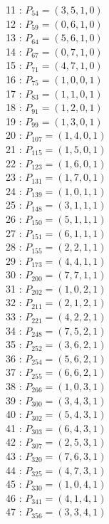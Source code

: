 \documentclass{article}
\begin{document}
{\begin{multicols}{3}
11 : $P_{54}=( 3, 5, 1, 0 )$\\
12 : $P_{59}=( 0, 6, 1, 0 )$\\
13 : $P_{64}=( 5, 6, 1, 0 )$\\
14 : $P_{67}=( 0, 7, 1, 0 )$\\
15 : $P_{71}=( 4, 7, 1, 0 )$\\
16 : $P_{75}=( 1, 0, 0, 1 )$\\
17 : $P_{83}=( 1, 1, 0, 1 )$\\
18 : $P_{91}=( 1, 2, 0, 1 )$\\
19 : $P_{99}=( 1, 3, 0, 1 )$\\
20 : $P_{107}=( 1, 4, 0, 1 )$\\
21 : $P_{115}=( 1, 5, 0, 1 )$\\
22 : $P_{123}=( 1, 6, 0, 1 )$\\
23 : $P_{131}=( 1, 7, 0, 1 )$\\
24 : $P_{139}=( 1, 0, 1, 1 )$\\
25 : $P_{148}=( 3, 1, 1, 1 )$\\
26 : $P_{150}=( 5, 1, 1, 1 )$\\
27 : $P_{151}=( 6, 1, 1, 1 )$\\
28 : $P_{155}=( 2, 2, 1, 1 )$\\
29 : $P_{173}=( 4, 4, 1, 1 )$\\
30 : $P_{200}=( 7, 7, 1, 1 )$\\
31 : $P_{202}=( 1, 0, 2, 1 )$\\
32 : $P_{211}=( 2, 1, 2, 1 )$\\
33 : $P_{221}=( 4, 2, 2, 1 )$\\
34 : $P_{248}=( 7, 5, 2, 1 )$\\
35 : $P_{252}=( 3, 6, 2, 1 )$\\
36 : $P_{254}=( 5, 6, 2, 1 )$\\
37 : $P_{255}=( 6, 6, 2, 1 )$\\
38 : $P_{266}=( 1, 0, 3, 1 )$\\
39 : $P_{300}=( 3, 4, 3, 1 )$\\
40 : $P_{302}=( 5, 4, 3, 1 )$\\
41 : $P_{303}=( 6, 4, 3, 1 )$\\
42 : $P_{307}=( 2, 5, 3, 1 )$\\
43 : $P_{320}=( 7, 6, 3, 1 )$\\
44 : $P_{325}=( 4, 7, 3, 1 )$\\
45 : $P_{330}=( 1, 0, 4, 1 )$\\
46 : $P_{341}=( 4, 1, 4, 1 )$\\
47 : $P_{356}=( 3, 3, 4, 1 )$\\

\end{multicols}}
\end{document}

